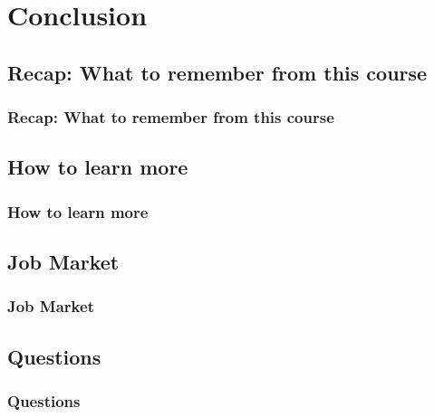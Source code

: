 



\begin{frame}
   \titlepage
\end{frame}



\begin{frame}
   \tableofcontents
\end{frame}

\section{Conclusion}


\subsection{Recap: What to remember from this course}
\begin{frame}\frametitle{Recap: What to remember from this course}
\end{frame}


\subsection{How to learn more}
\begin{frame}\frametitle{How to learn more}
\end{frame}


\subsection{Job Market}
\begin{frame}\frametitle{Job Market}
\end{frame}


\subsection{Questions}
\begin{frame}\frametitle{Questions}
\end{frame}




